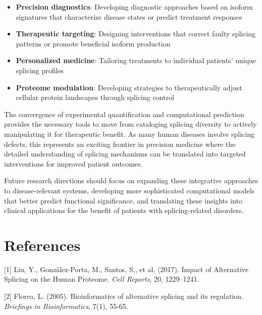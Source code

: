 \documentclass[12pt,a4paper]{article}
\begin{document}
\begin{itemize}
    \item \textbf{Precision diagnostics}: Developing diagnostic approaches based on isoform signatures that characterize disease states or predict treatment responses
    \item \textbf{Therapeutic targeting}: Designing interventions that correct faulty splicing patterns or promote beneficial isoform production
    \item \textbf{Personalized medicine}: Tailoring treatments to individual patients' unique splicing profiles
    \item \textbf{Proteome modulation}: Developing strategies to therapeutically adjust cellular protein landscapes through splicing control
\end{itemize}

The convergence of experimental quantification and computational prediction provides the necessary tools to move from cataloging splicing diversity to actively manipulating it for therapeutic benefit. As many human diseases involve splicing defects, this represents an exciting frontier in precision medicine where the detailed understanding of splicing mechanisms can be translated into targeted interventions for improved patient outcomes.

Future research directions should focus on expanding these integrative approaches to disease-relevant systems, developing more sophisticated computational models that better predict functional significance, and translating these insights into clinical applications for the benefit of patients with splicing-related disorders.

\section{References}

[1] Liu, Y., Gonzàlez-Porta, M., Santos, S., et al. (2017). Impact of Alternative Splicing on the Human Proteome. \textit{Cell Reports}, 20, 1229–1241.

[2] Florea, L. (2005). Bioinformatics of alternative splicing and its regulation. \textit{Briefings in Bioinformatics}, 7(1), 55-65.
\end{document}
